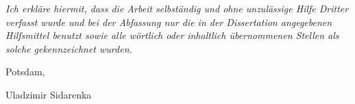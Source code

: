 \vspace*{\fill}

\textit{Ich erkl\"are hiermit, dass die Arbeit selbst\"andig und ohne
  unzul\"assige Hilfe Dritter verfasst wurde und bei der Abfassung nur die in
  der Dissertation angegebenen Hilfsmittel benutzt sowie alle w\"ortlich oder
  inhaltlich \"ubernommenen Stellen als solche gekennzeichnet wurden.}

\begin{flushright}
Potsdam, \the\year

Uladzimir Sidarenka
\end{flushright}
\vspace*{\fill}
